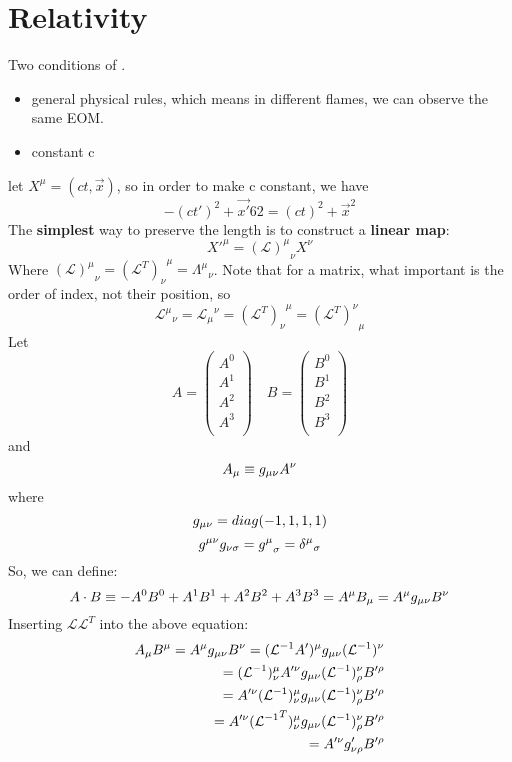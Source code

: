 \section{Relativity}
Two conditions of \SR{}. 
\begin{itemize}
    \item general physical rules, which means in different flames, we can 
	observe the same EOM.
    \item constant c
\end{itemize}
let $X^\mu=(ct, \vec{x})$, so in order to make c constant, we have
\[
    -(ct')^2+\vec{x'}62 = (ct)^2 +\vec{x}^2
\]
The \textbf{simplest} way to preserve the length is to construct a \textbf{linear map}:
\[
    X'^\mu = {(\mathcal{L})^\mu}_{\nu}X^\nu
\]
Where ${(\mathcal{L})^\mu}_{\nu} = {(\mathcal{L}^T)_\nu}^{\mu} = {\Lambda^\mu}_\nu$.
Note that for a matrix, what important is the order of index, not their position, so
\[
    {\mathcal{L}^{\mu}}_{\nu}={\mathcal{L}_{\mu}}^{\nu}={(\mathcal{L}^T)_{\nu}}^{\mu}={(\mathcal{L}^T)^{\nu}}_{\mu}
\]
Let 
\[
    A = \begin{pmatrix}
	A^0 \\
	A^1 \\
	A^2 \\
	A^3 \\
    \end{pmatrix}\quad
    B = \begin{pmatrix}
	B^0 \\
	B^1 \\
	B^2 \\
	B^3 \\
    \end{pmatrix}
\]
and 
\[
    A_\mu  \equiv g_{\mu\nu}A^\nu
\]
where 
\begin{equation}
    g_{\mu\nu} = diag(-1, 1, 1, 1)
\end{equation}
\[
    g^{\mu\nu}g_{\nu\sigma}={g^{\mu}}_\sigma={\delta^{\mu}}_\sigma 
\]
So, we can define:
\[
    A\cdot B \equiv -A^0B^0 + A^1B^1 + A^2B^2 + A^3B^3 = A^\mu B_\mu = A^\mu g_{\mu\nu}B^\nu
\]
Inserting $\mathcal{L}\mathcal{L}^T$ into the above equation:
\[
    \begin{aligned}
	A_\mu B^\mu= A^\mu g_{\mu\nu}B^\nu = (\mathcal{L}^{-1}A')^{\mu}g_{\mu\nu}(\mathcal{L}^{-1})^\nu \\
	= (\mathcal{L}^{-1})^\mu_{\nu}A'^{\nu}g_{\mu\nu}(\mathcal{L}^{-1})^\nu_{\rho}B'^\rho    \\
	= A'^{\nu}(\mathcal{L}^{-1})^\mu_{\nu}g_{\mu\nu}(\mathcal{L}^{-1})^\nu_{\rho}B'^\rho    \\
	= A'^{\nu}({\mathcal{L}^{-1}}^T)_\nu^{\mu}g_{\mu\nu}(\mathcal{L}^{-1})^\nu_{\rho}B'^\rho    \\
	= A'^{\nu}g'_{\nu\rho}B'^\rho
    \end{aligned}
\]
